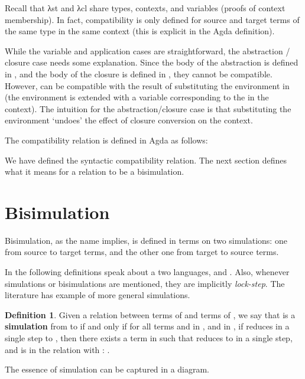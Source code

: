 \documentclass[bsc,frontabs,oneside,singlespacing,parskip,deptreport]{infthesis}
\theoremstyle{definition}
\newtheorem*{definition}{Definition}
\theoremstyle{lemma}
\begin{document}
Recall that λst and λcl share types, contexts, and variables (proofs
of context membership). In fact, compatibility is only defined for source
and target terms of the same type in the same context (this is
explicit in the Agda definition).

While the variable and application cases are straightforward, the
abstraction / closure case needs some explanation. Since the body
 of the abstraction is defined in , and the body of
the closure  is defined in , they cannot be
compatible. However,  can be compatible with the result of
substituting the environment  in  (the environment is
extended with a variable corresponding to the  in the
context). The intuition for the abstraction/closure case is that
substituting the environment `undoes' the effect of closure conversion
on the context. 

The compatibility relation is defined in Agda as follows:


We have defined the syntactic compatibility relation. The next
section defines what it means for a relation to be a bisimulation.

\section{Bisimulation}

Bisimulation, as the name implies, is defined in terms on two
simulations: one from source to target terms, and the other one from
target to source terms.

In the following definitions speak about a two languages,  and
. Also, whenever simulations or bisimulations are mentioned,
they are implicitly \textit{lock-step}. The literature has example of
more general simulations.

\begin{definition}
  Given a relation  between terms of  and terms of ,
  we say that  is a \textbf{simulation} from  to  if
  and only if for all terms  and  in , and 
  in , if  reduces in a single step to , then there
  exists a term  in  such that  reduces to 
  in a single step, and  is in the  relation with :
  .
\end{definition}

The essence of simulation can be captured in a diagram.
\end{document}
